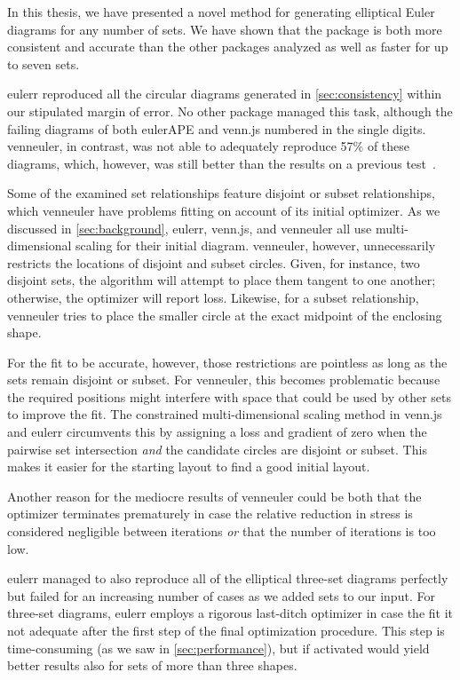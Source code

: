 \documentclass[
  oneside,
  openany,
  numbers=noendperiod,
  parskip=half,
  bibliography=totoc
]{scrbook}\usepackage[]{graphicx}\usepackage{xcolor}
\newcommand{\pkg}[1]{{\fontseries{b}\selectfont #1}}
\begin{document}
In this thesis, we have presented a novel method for generating elliptical Euler diagrams
for any number of sets. We have shown that the package
is both more consistent and accurate than the other packages analyzed as well as
faster for up to seven sets.

\pkg{eulerr} reproduced all the circular diagrams
generated in \cref{sec:consistency} within our stipulated margin of error.
No other package managed this task, although the failing diagrams of both
\pkg{eulerAPE} and \pkg{venn.js} numbered in the single digits.
\pkg{venneuler}, in contrast, was not able to adequately
reproduce 57\%
of these diagrams, which, however, was still
better than the results on a previous
test~\citep{Frederickson_2015b}.

Some of the examined set relationships feature disjoint or subset
relationships, which \pkg{venneuler} have problems fitting on account of its
initial optimizer. As we discussed in \cref{sec:background},
\pkg{eulerr}, \pkg{venn.js}, and \pkg{venneuler} all use multi-dimensional scaling for
their initial diagram. \pkg{venneuler}, however, unnecessarily restricts the
locations of disjoint and subset circles. Given, for instance, two disjoint
sets, the algorithm will attempt to place them tangent to one another; otherwise,
the optimizer will report loss. Likewise, for a subset
relationship, \pkg{venneuler} tries to place the smaller circle at the exact
midpoint of the enclosing shape.

For the fit to be accurate, however, those restrictions are pointless as long as
the sets remain disjoint or subset.
For \pkg{venneuler}, this becomes problematic because the required positions might interfere
with space that could be used by other sets to improve the fit. The
constrained multi-dimensional scaling method in \pkg{venn.js} and
\pkg{eulerr} circumvents this by
assigning a loss and gradient of zero when the pairwise set intersection
\emph{and} the candidate circles are disjoint or subset. This makes it easier
for the starting layout to find a good initial layout.

Another reason for the mediocre results of \pkg{venneuler} could be both that the optimizer
terminates prematurely in case the relative reduction in stress is considered negligible
between iterations \emph{or} that the number of iterations is too low.

\pkg{eulerr} managed to also reproduce all of the elliptical
three-set diagrams perfectly but failed for an increasing number of cases as we
added sets to our input.
For three-set diagrams, \pkg{eulerr} employs a rigorous last-ditch
optimizer in case the fit it not adequate after the first step of
the final optimization procedure. This step is
time-consuming (as we saw in \cref{sec:performance}), but if activated
would yield better results also for sets of more than three shapes.
\end{document}

